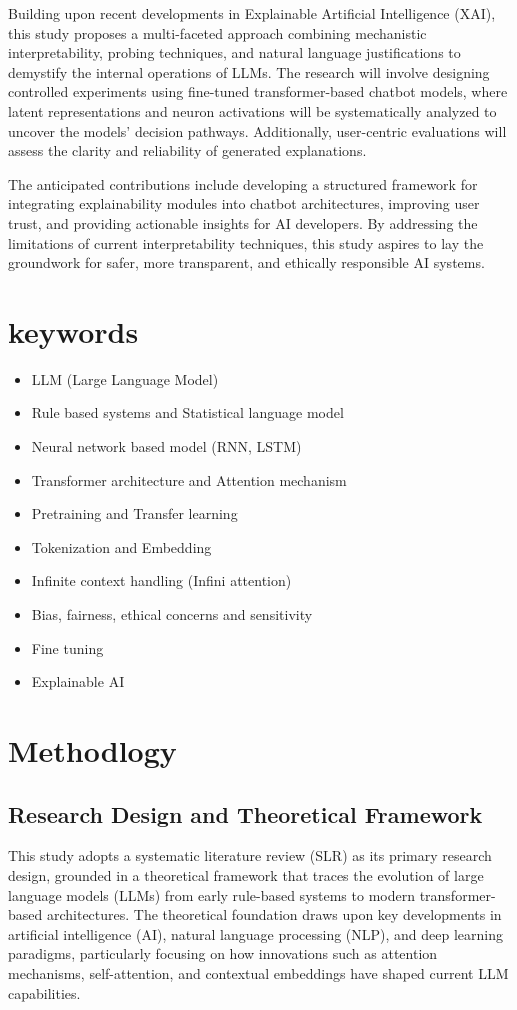 \documentclass[conference]{IEEEtran}
\begin{document}
Building upon recent developments in Explainable Artificial Intelligence (XAI), this study proposes a multi-faceted approach combining mechanistic interpretability, probing techniques, and natural language justifications to demystify the internal operations of LLMs. The research will involve designing controlled experiments using fine-tuned transformer-based chatbot models, where latent representations and neuron activations will be systematically analyzed to uncover the models’ decision pathways. Additionally, user-centric evaluations will assess the clarity and reliability of generated explanations.

The anticipated contributions include developing a structured framework for integrating explainability modules into chatbot architectures, improving user trust, and providing actionable insights for AI developers. By addressing the limitations of current interpretability techniques, this study aspires to lay the groundwork for safer, more transparent, and ethically responsible AI systems.

\section{keywords}
\begin{itemize}
    \item LLM (Large Language Model)
    \item Rule based systems and Statistical language model
    \item Neural network based model (RNN, LSTM)
    \item Transformer architecture and Attention mechanism
    \item Pretraining and Transfer learning
    \item Tokenization and Embedding
    \item Infinite context handling (Infini attention)
    \item Bias, fairness, ethical concerns and sensitivity
    \item Fine tuning
    \item Explainable AI
\end{itemize}



\section{Methodlogy}
\subsection{Research Design and Theoretical Framework}
This study adopts a systematic literature review (SLR) as its primary research design, grounded in a theoretical framework that traces the evolution of large language models (LLMs) from early rule-based systems to modern transformer-based architectures. The theoretical foundation draws upon key developments in artificial intelligence (AI), natural language processing (NLP), and deep learning paradigms, particularly focusing on how innovations such as attention mechanisms, self-attention, and contextual embeddings have shaped current LLM capabilities.
\end{document}
